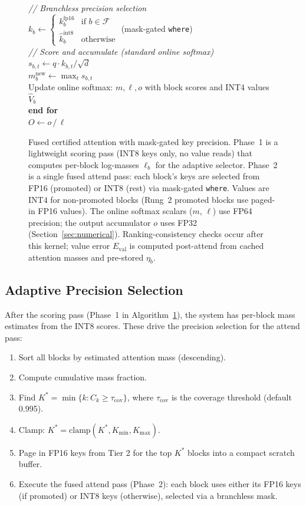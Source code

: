 \documentclass[11pt,a4paper]{article}
\theoremstyle{definition}
\theoremstyle{remark}
\begin{document}
\begin{figure}[H]
\begin{center}
{{\quad \textit{// Branchless precision selection} \\
\quad $k_b \leftarrow \begin{cases} k^{\mathrm{fp16}}_b & \text{if } b \in \mathcal{F} \\ \hat{k}^{\mathrm{int8}}_b & \text{otherwise} \end{cases}$ \quad (mask-gated \texttt{where}) \\[2pt]
\quad \textit{// Score and accumulate (standard online softmax)} \\
\quad $s_{b,t} \leftarrow q \cdot k_{b,t} / \sqrt{d}$ \\
\quad $m_b^{\mathrm{new}} \leftarrow \max_t s_{b,t}$ \\
\quad Update online softmax: $m, \ell, o$ with block scores and INT4 values $\hat{V}_b$ \\
\textbf{end for} \\[3pt]
$O \leftarrow o \,/\, \ell$
}}
\end{center}
\caption{Fused certified attention with mask-gated key precision.  Phase~1 is a lightweight scoring pass (INT8 keys only, no value reads) that computes per-block log-masses $\ell_b$ for the adaptive selector.  Phase~2 is a single fused attend pass: each block's keys are selected from FP16 (promoted) or INT8 (rest) via mask-gated \texttt{where}.  Values are INT4 for non-promoted blocks (Rung~2 promoted blocks use paged-in FP16 values).  The online softmax scalars ($m$, $\ell$) use FP64 precision; the output accumulator $o$ uses FP32 (Section~\ref{sec:numerical}).  Ranking-consistency checks occur after this kernel; value error $E_{\mathrm{val}}$ is computed post-attend from cached attention masses and pre-stored $\eta_b$.}
\label{alg:fused}
\end{figure}

\subsection{Adaptive Precision Selection}
\label{sec:adaptive}

After the scoring pass (Phase~1 in Algorithm~\ref{alg:fused}), the system has per-block mass estimates from the INT8 scores.  These drive the precision selection for the attend pass:

\begin{enumerate}[leftmargin=2em,itemsep=2pt]
  \item Sort all blocks by estimated attention mass (descending).
  \item Compute cumulative mass fraction.
  \item Find $K^* = \min\{k : C_k \geq \tau_{\mathrm{cov}}\}$, where $\tau_{\mathrm{cov}}$ is the coverage threshold (default 0.995).
  \item Clamp: $K^* = \mathrm{clamp}(K^*, K_{\min}, K_{\max})$.
  \item Page in FP16 keys from Tier 2 for the top $K^*$ blocks into a compact scratch buffer.
  \item Execute the fused attend pass (Phase~2): each block uses either its FP16 keys (if promoted) or INT8 keys (otherwise), selected via a branchless mask.
\end{enumerate}
\end{document}
